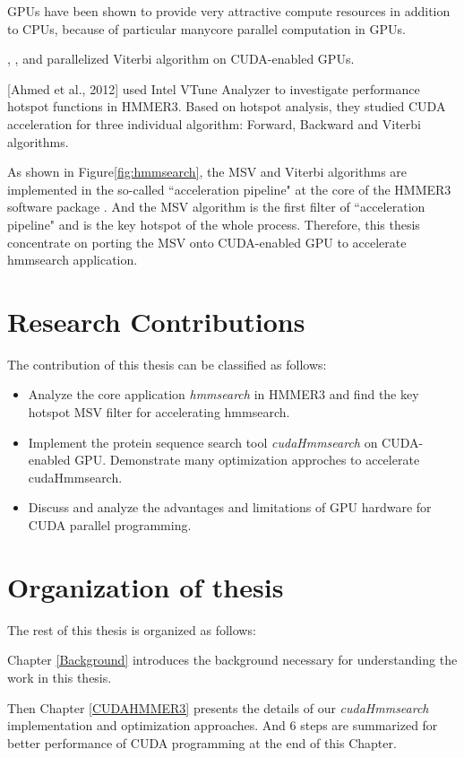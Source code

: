 GPUs have been shown to provide very attractive compute resources in addition to CPUs, because of particular manycore parallel computation in GPUs.

\citep{GPUHMM}, \citep{Ganesan}, \citep{Du} and \citep{Quirem} parallelized Viterbi algorithm on CUDA-enabled GPUs.

[Ahmed et al., 2012]\citep{Ahmed} used Intel VTune Analyzer \citep{Intel} to investigate performance hotspot functions in HMMER3. Based on hotspot analysis, they studied CUDA acceleration for three individual algorithm: Forward, Backward and Viterbi algorithms.

As shown in Figure\ref{fig:hmmsearch}, the MSV and Viterbi algorithms are implemented in the so-called ``acceleration pipeline" at the core of the HMMER3 software package \citep{HMMER3}. And the MSV algorithm is the first filter of ``acceleration pipeline" and is the key hotspot of the whole process. Therefore, this thesis concentrate on porting the MSV onto CUDA-enabled GPU to accelerate hmmsearch application.

\section{Research Contributions}
The contribution of this thesis can be classified as follows:
\begin{itemize}
 \item Analyze the core application \emph{hmmsearch} in HMMER3 and find the key hotspot MSV filter for accelerating hmmsearch.
 \item Implement the protein sequence search tool \emph{cudaHmmsearch} on CUDA-enabled GPU. Demonstrate many optimization approches to accelerate cudaHmmsearch.
 \item Discuss and analyze the advantages and limitations of GPU hardware for CUDA parallel programming.
\end{itemize}

\section{Organization of thesis}
The rest of this thesis is organized as follows:

Chapter \ref{Background} introduces the background necessary for understanding the work in this thesis.

Then Chapter \ref{CUDAHMMER3} presents the details of our \emph{cudaHmmsearch} implementation and optimization approaches. And 6 steps are summarized for better performance of CUDA programming at the end of this Chapter.

